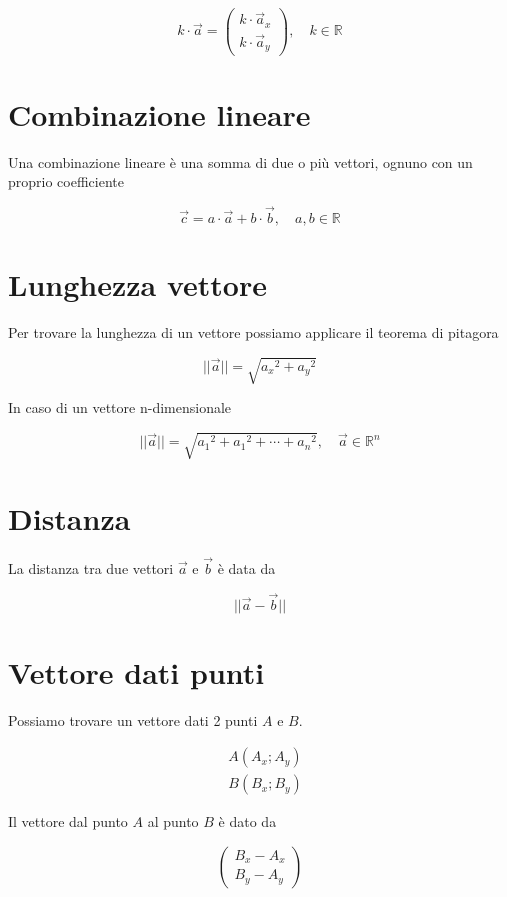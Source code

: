 \documentclass{article}
\begin{document}
\[
    k\cdot\vec{a} =
    \begin{pmatrix}
        k\cdot \vec{a}_x \\
        k\cdot \vec{a}_y
    \end{pmatrix},
    \quad k\in\mathbb{R}
\]

\section{Combinazione lineare}

Una combinazione lineare è una somma di due o più vettori, ognuno con un proprio coefficiente

\[
    \vec{c} = a \cdot\vec{a} + b\cdot\vec{b},
    \quad a,b\in \mathbb{R}
\]

\section{Lunghezza vettore}

Per trovare la lunghezza di un vettore possiamo applicare il teorema di pitagora

\[
    ||\vec{a}|| = \sqrt{{a_x}^2 + {a_y}^2}
\]

In caso di un vettore n-dimensionale

\[
    ||\vec{a}|| = \sqrt{{a_1}^2 + {a_1}^2 + \cdots + {a_n}^2},
    \quad \vec{a}\in\mathbb{R}^n
\]

\section{Distanza}

La distanza tra due vettori \(\vec{a}\) e \(\vec{b}\) è data da

\[
    ||\vec{a}-\vec{b}||
\]

\section{Vettore dati punti}

Possiamo trovare un vettore dati 2 punti \(A\) e \(B\).

\begin{align*}
    &A(A_x; A_y) \\
    &B(B_x; B_y)
\end{align*}

Il vettore dal punto \(A\) al punto \(B\) è dato da

\[
    \begin{pmatrix}
        B_x - A_x \\
        B_y - A_y
    \end{pmatrix}
\]
\end{document}
